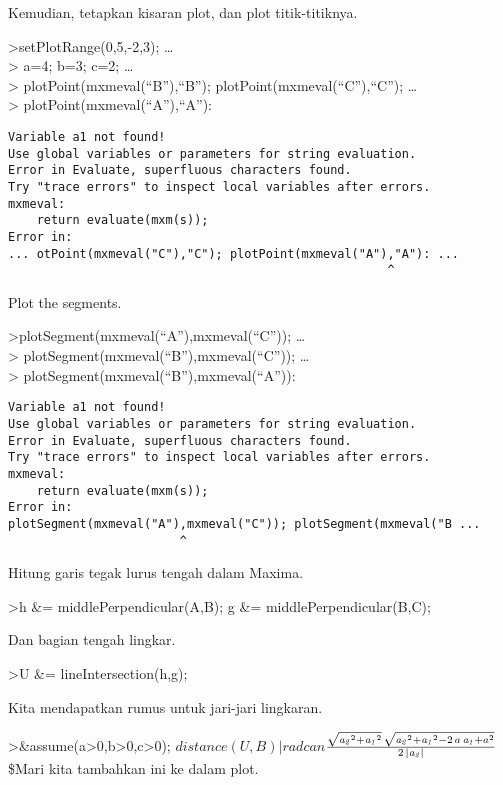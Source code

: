 \documentclass[
]{book}
\begin{document}
Kemudian, tetapkan kisaran plot, dan plot titik-titiknya.

\textgreater setPlotRange(0,5,-2,3); \ldots{}\\
\textgreater{} a=4; b=3; c=2; \ldots{}\\
\textgreater{} plotPoint(mxmeval(``B''),``B''); plotPoint(mxmeval(``C''),``C''); \ldots{}\\
\textgreater{} plotPoint(mxmeval(``A''),``A''):

\begin{verbatim}
Variable a1 not found!
Use global variables or parameters for string evaluation.
Error in Evaluate, superfluous characters found.
Try "trace errors" to inspect local variables after errors.
mxmeval:
    return evaluate(mxm(s));
Error in:
... otPoint(mxmeval("C"),"C"); plotPoint(mxmeval("A"),"A"): ...
                                                     ^
\end{verbatim}

Plot the segments.

\textgreater plotSegment(mxmeval(``A''),mxmeval(``C'')); \ldots{}\\
\textgreater{} plotSegment(mxmeval(``B''),mxmeval(``C'')); \ldots{}\\
\textgreater{} plotSegment(mxmeval(``B''),mxmeval(``A'')):

\begin{verbatim}
Variable a1 not found!
Use global variables or parameters for string evaluation.
Error in Evaluate, superfluous characters found.
Try "trace errors" to inspect local variables after errors.
mxmeval:
    return evaluate(mxm(s));
Error in:
plotSegment(mxmeval("A"),mxmeval("C")); plotSegment(mxmeval("B ...
                        ^
\end{verbatim}

Hitung garis tegak lurus tengah dalam Maxima.

\textgreater h \&= middlePerpendicular(A,B); g \&= middlePerpendicular(B,C);

Dan bagian tengah lingkar.

\textgreater U \&= lineIntersection(h,g);

Kita mendapatkan rumus untuk jari-jari lingkaran.

\textgreater\&assume(a\textgreater0,b\textgreater0,c\textgreater0); \(distance(U,B) | radcan\)\(\frac{\sqrt{{\it a_2}^2+{\it a_1}^2}\,\sqrt{{\it a_2}^2+{\it a_1}^2  -2\,a\,{\it a_1}+a^2}}{2\,\left| {\it a_2}\right| }\)\$Mari kita tambahkan ini ke dalam plot.
\end{document}

